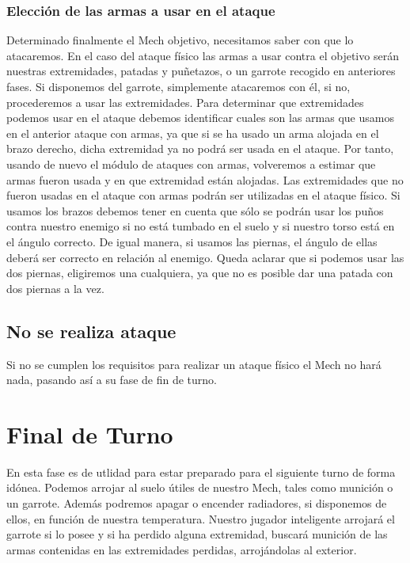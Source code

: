 \documentclass[a4paper,12pt,oneside]{book}
\begin{document}
\subsubsection*{Elección de las armas a usar en el ataque}
Determinado finalmente el Mech objetivo, necesitamos saber con que lo atacaremos. En el caso del ataque físico las armas a usar contra el objetivo serán nuestras extremidades, patadas y puñetazos, o un garrote recogido en anteriores fases.
Si disponemos del garrote, simplemente atacaremos con él, si no, procederemos a usar las extremidades. Para determinar que extremidades podemos usar en el ataque debemos  identificar cuales son las armas que usamos en el anterior ataque con armas, ya que si se ha usado un arma alojada en el brazo derecho, dicha extremidad ya no podrá ser usada en el ataque. Por tanto,  usando de nuevo el módulo de ataques con armas,  volveremos  a estimar  que armas fueron usada y en que extremidad  están  alojadas. Las extremidades que no fueron usadas en el ataque con armas podrán ser  utilizadas en el ataque físico. Si usamos los brazos debemos tener en cuenta que sólo se podrán usar los puños contra nuestro enemigo si no está tumbado en el suelo y si nuestro torso está en el ángulo correcto. De igual manera, si usamos las piernas,  el ángulo de ellas deberá ser correcto en relación al enemigo. Queda aclarar que si podemos usar las dos piernas, eligiremos una cualquiera, ya que no es posible dar una patada con dos piernas a la vez.
\subsection*{No se realiza ataque}
Si no se cumplen los requisitos para realizar un ataque físico el Mech no hará nada, pasando así a su fase de fin de turno.

\section{Final de Turno}
 
En esta fase es de utlidad para estar preparado para el siguiente turno de forma idónea. Podemos arrojar al suelo útiles de nuestro Mech, tales como munición o un garrote.
Además podremos apagar o encender radiadores, si disponemos de ellos, en función de nuestra temperatura.
Nuestro jugador inteligente arrojará el garrote si lo posee y si ha perdido alguna extremidad, buscará munición de las armas contenidas en las extremidades perdidas, arrojándolas al exterior.
\end{document}
